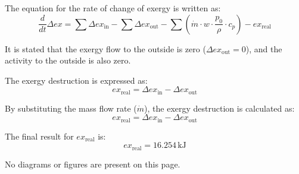 The equation for the rate of change of exergy is written as:  
\[
\frac{d}{dt} \Delta ex = \sum \Delta ex_{\text{in}} - \sum \Delta ex_{\text{out}} - \sum \left( \dot{m} \cdot w \cdot \frac{p_0}{\rho} \cdot c_p \right) - ex_{\text{real}}
\]  

It is stated that the exergy flow to the outside is zero (\( \Delta ex_{\text{out}} = 0 \)), and the activity to the outside is also zero.  

The exergy destruction is expressed as:  
\[
ex_{\text{real}} = \Delta ex_{\text{in}} - \Delta ex_{\text{out}}
\]  

By substituting the mass flow rate (\( \dot{m} \)), the exergy destruction is calculated as:  
\[
ex_{\text{real}} = \Delta ex_{\text{in}} - \Delta ex_{\text{out}}
\]  

The final result for \( ex_{\text{real}} \) is:  
\[
ex_{\text{real}} = 16.254 \, \text{kJ}
\]  

No diagrams or figures are present on this page.